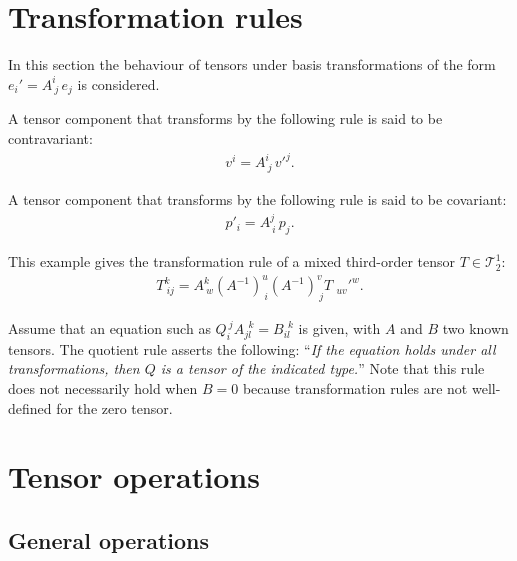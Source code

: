 \section{Transformation rules}

    In this section the behaviour of tensors under basis transformations of the form $e_i' = A^i_{\ j}\,e_j$ is considered.

    \begin{definition}[Contravariant]\label{vector:contravariant}
        A tensor component that transforms by the following rule is said to be contravariant:
        \begin{gather}
            v^i = A^i_{\ j}\,v'^j.
        \end{gather}
    \end{definition}
    \begin{definition}[Covariant]\label{vector:covariant}
        A tensor component that transforms by the following rule is said to be covariant:
        \begin{gather}
            p'_i = A^j_{\ i}\,p_j.
        \end{gather}
    \end{definition}
    \begin{example}
        This example gives the transformation rule of a mixed third-order tensor $T\in\mathcal{T}^1_2$:
        \begin{gather}
            T_{\ ij}^k = A^k_{\ w}(A^{-1})^u_{\ i}(A^{-1})^v_{\ j}T_{\ \ uv}'^w.
        \end{gather}
    \end{example}

    \begin{method}
        Assume that an equation such as $Q_i^{\ j}A_{jl}^{\ \ k}=B_{il}^{\ \ k}$ is given, with $A$ and $B$ two known tensors. The quotient rule asserts the following: ``\textit{If the equation holds under all transformations, then $Q$ is a tensor of the indicated type.}'' Note that this rule does not necessarily hold when $B=0$ because transformation rules are not well-defined for the zero tensor.
    \end{method}

\section{Tensor operations}
\subsection{General operations}

